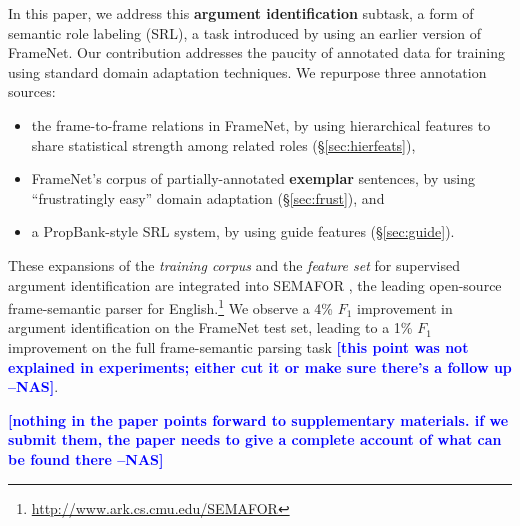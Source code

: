 \documentclass[11pt,a4paper]{article}
\newcommand{\nascomment}[1]{\textcolor{blue}{\textbf{\small [#1 --NAS]}}}
\begin{document}
In this paper, we address this \textbf{argument identification} 
subtask, a form of semantic role labeling (SRL), 
a task introduced by \citet{gildea-02} using an earlier version of FrameNet.
Our contribution addresses the paucity of annotated data for training 
using  standard domain
adaptation techniques.  We repurpose three annotation sources:
\begin{itemize}
  \item the frame-to-frame relations in FrameNet, by using
  hierarchical features to share statistical strength among related roles
  (\S\ref{sec:hierfeats}),
  \item FrameNet's corpus of partially-annotated \textbf{exemplar} sentences,
  by using ``frustratingly easy'' domain adaptation (\S\ref{sec:frust}), and
  \item a PropBank-style SRL system, by using guide features (\S\ref{sec:guide}).
\end{itemize}
These expansions of the \emph{training corpus} and the \emph{feature set}
for supervised argument identification  are integrated into SEMAFOR
\citep{das-14},  the leading open-source frame-semantic parser for English.\footnote{\url{http://www.ark.cs.cmu.edu/SEMAFOR}} 
We observe a 4\% $F_1$ improvement in argument identification on the
FrameNet test set, leading to a 1\% $F_1$ improvement on the full
frame-semantic parsing task \nascomment{this point was not explained
  in experiments; either cut it or make sure there's a follow up}.

\nascomment{nothing in the paper points forward to supplementary
  materials.  if we submit them, the paper needs to give a complete
  account of what can be found there}
\end{document}
